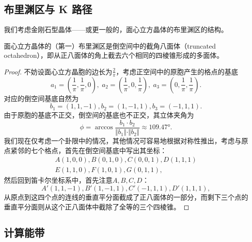 \subsection{布里渊区与 K 路径}

我们考虑金刚石型晶体——或更一般的，面心立方晶体的布里渊区的结构。

\begin{proposition}
    面心立方晶体的（第一）布里渊区是倒空间中的截角八面体（truncated octahedron），即从正八面体的角上截去六个相同的四棱锥形成的多面体。
\end{proposition}

\begin{proof}
    不妨设面心立方晶胞的边长为$\frac{2}{\pi}$，考虑正空间中的原胞产生的格点的基底
    \begin{equation}
        a_1 = (\frac{1}{\pi}, \frac{1}{\pi}, 0), \; a_2 = (\frac{1}{\pi}, 0, \frac{1}{\pi}), \; a_3 = (0, \frac{1}{\pi}, \frac{1}{\pi}).
    \end{equation}
    对应的倒空间基底自然为
    \begin{equation}
        b_1 =  (1, 1, -1), b_2 = (1, -1, 1), b_3 = (- 1, 1, 1).
    \end{equation}
    由于原胞的基底不正交，倒空间的基底也不正交，其立体夹角为
    \begin{equation}
        \phi = \arccos \frac{b_1 \cdot b_2}{\Vert b_1 \Vert \cdot \Vert b_2 \Vert} \approx \ang{109.47}.
    \end{equation}
    我们现在仅考虑一个卦限中的情况，其他情况可容易地根据对称性推出，考虑与原点紧邻的七个格点，首先在倒空间基底中写出其坐标：
    \begin{equation}
        \begin{aligned}
            A(1, 0, 0), B(0, 1, 0), C(0, 0, 1), D(1, 1, 1) \\
            E(1, 1, 0), F(1, 0, 1), G(0, 1, 1), 
        \end{aligned}
    \end{equation}
    然后回到笛卡尔坐标系中，首先注意$A, B, C, D$：
    \begin{equation}
        A' (1, 1, -1), B' (1, -1, 1), C'(-1, 1, 1), D'(1, 1, 1),
    \end{equation}
    从原点到这四个点的连线的垂直平分面截成了正八面体的一部分，而剩下三个点的垂直平分面则从这个正八面体中截除了全等的三个四棱锥。
\end{proof}

\subsection{计算能带}
